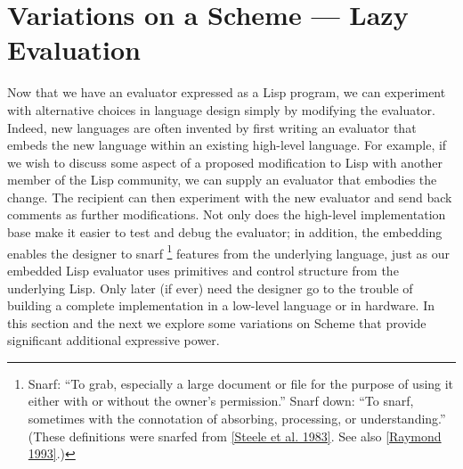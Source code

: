 \section{Variations on a Scheme --- Lazy Evaluation}
\label{Section 4.2}

Now that we have an evaluator expressed as a Lisp program, we can experiment with alternative choices in language design simply by modifying the evaluator.
Indeed, new languages are often invented by first writing an evaluator that embeds the new language within an existing high-level language.
For example, if we wish to discuss some aspect of a proposed modification to Lisp with another member of the Lisp community, we can supply an evaluator that embodies the change.
The recipient can then experiment with the new evaluator and send back comments as further modifications.
Not only does the high-level implementation base make it easier to test and debug the evaluator;
in addition, the embedding enables the designer to snarf%
\footnote{
	Snarf:
	“To grab, especially a large document or file for the purpose of using it either with or without the owner’s permission.”
	Snarf down:
	“To snarf, sometimes with the connotation of absorbing, processing, or understanding.”
	(These definitions were snarfed from \cref{Steele et al. 1983}.
	See also \cref{Raymond 1993}.)
}
features from the underlying language, just as our embedded Lisp evaluator uses primitives and control structure from the underlying Lisp.
Only later (if ever) need the designer go to the trouble of building a complete implementation in a low-level language or in hardware.
In this section and the next we explore some variations on Scheme that provide significant additional expressive power.





